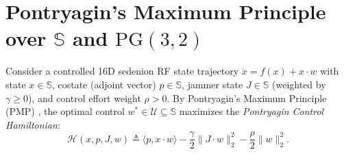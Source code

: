 \documentclass[journal,twoside]{IEEEtran}
\theoremstyle{definition}
\theoremstyle{remark}
\newcommand{\Se}{\mathbb{S}}
\newcommand{\PG}{\mathrm{PG}}
\begin{document}
\section{Pontryagin's Maximum Principle over $\Se$ and $\PG(3,2)$}
\label{sec:pontryagin}
Consider a controlled 16D sedenion RF state trajectory $\dot{x} = f(x) + x \cdot w$ with state $x \in \Se$, costate (adjoint vector) $p \in \Se$, jammer state $J \in \Se$ (weighted by $\gamma \ge 0$), and control effort weight $\rho > 0$. By Pontryagin's Maximum Principle (PMP) \cite{Pontryagin1962}, the optimal control $w^* \in \mathcal{U} \subseteq \Se$ maximizes the \emph{Pontryagin Control Hamiltonian}:
\begin{equation}
    \mathcal{H}(x, p, J, w) \triangleq \langle p, x \cdot w\rangle - \frac{\gamma}{2}\|J \cdot w\|_2^2 - \frac{\rho}{2}\|w\|_2^2.
    \label{eq:pmp_hamiltonian}
\end{equation}
\end{document}
